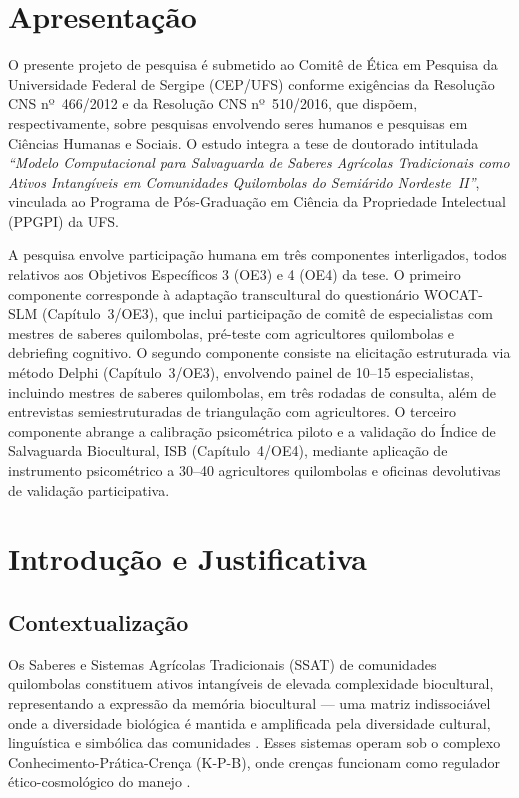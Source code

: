 \documentclass[12pt,a4paper,brazil]{article}
\begin{document}
\section{Apresentação}

O presente projeto de pesquisa é submetido ao Comitê de Ética em Pesquisa da Universidade Federal de Sergipe (CEP/UFS) conforme exigências da Resolução CNS nº~466/2012 e da Resolução CNS nº~510/2016, que dispõem, respectivamente, sobre pesquisas envolvendo seres humanos e pesquisas em Ciências Humanas e Sociais. O estudo integra a tese de doutorado intitulada \textit{``Modelo Computacional para Salvaguarda de Saberes Agrícolas Tradicionais como Ativos Intangíveis em Comunidades Quilombolas do Semiárido Nordeste~II''}, vinculada ao Programa de Pós-Graduação em Ciência da Propriedade Intelectual (PPGPI) da UFS.

A pesquisa envolve participação humana em três componentes interligados, todos relativos aos Objetivos Específicos 3 (OE3) e 4 (OE4) da tese. O primeiro componente corresponde à adaptação transcultural do questionário WOCAT-SLM (Capítulo~3/OE3), que inclui participação de comitê de especialistas com mestres de saberes quilombolas, pré-teste com agricultores quilombolas e debriefing cognitivo. O segundo componente consiste na elicitação estruturada via método Delphi (Capítulo~3/OE3), envolvendo painel de 10--15 especialistas, incluindo mestres de saberes quilombolas, em três rodadas de consulta, além de entrevistas semiestruturadas de triangulação com agricultores. O terceiro componente abrange a calibração psicométrica piloto e a validação do Índice de Salvaguarda Biocultural, ISB (Capítulo~4/OE4), mediante aplicação de instrumento psicométrico a 30--40 agricultores quilombolas e oficinas devolutivas de validação participativa.


\section{Introdução e Justificativa}

\subsection{Contextualização}

Os Saberes e Sistemas Agrícolas Tradicionais (SSAT) de comunidades quilombolas constituem ativos intangíveis de elevada complexidade biocultural, representando a expressão da memória biocultural --- uma matriz indissociável onde a diversidade biológica é mantida e amplificada pela diversidade cultural, linguística e simbólica das comunidades \citep{Toledo2008}. Esses sistemas operam sob o complexo Conhecimento-Prática-Crença (K-P-B), onde crenças funcionam como regulador ético-cosmológico do manejo \citep{Berkes2017}.
\end{document}
